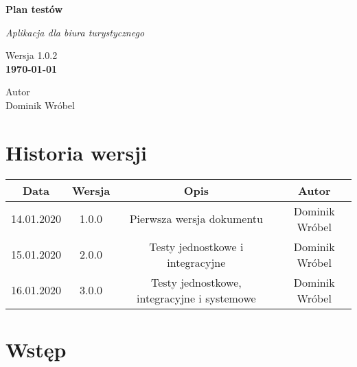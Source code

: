 \documentclass[a4paper,15pt]{article}
\begin{document}
\begin{titlepage}
   \begin{center}
       \vspace*{1cm}
 
       \LARGE{\textbf{Plan testów}}
 
       \vspace{0.5cm}
       \textit{Aplikacja dla biura turystycznego}
 
       \vspace{1.5cm}
 		
 	   Wersja 1.0.2 \\
       \textbf{\today}
 
       \vfill
 
 
       \vspace{0.8cm}
 
 		Autor \\
       Dominik Wróbel\\
       
       
   \end{center}
\end{titlepage}


\newpage
\tableofcontents



\newpage
\section{Historia wersji}

\begin{center}
 \begin{tabular}{||c c c c||} 
 \hline
 Data & Wersja & Opis & Autor \\ [0.5ex] 
 \hline\hline
 14.01.2020 & 1.0.0 & Pierwsza wersja dokumentu & Dominik Wróbel \\ 
 \hline
 15.01.2020 & 2.0.0 & Testy jednostkowe i integracyjne & Dominik Wróbel \\
 \hline
 16.01.2020 & 3.0.0 & Testy jednostkowe, integracyjne i systemowe & Dominik Wróbel \\ [1ex] 
 \hline
\end{tabular}
\end{center}

\section{Wstęp}
\end{document}
